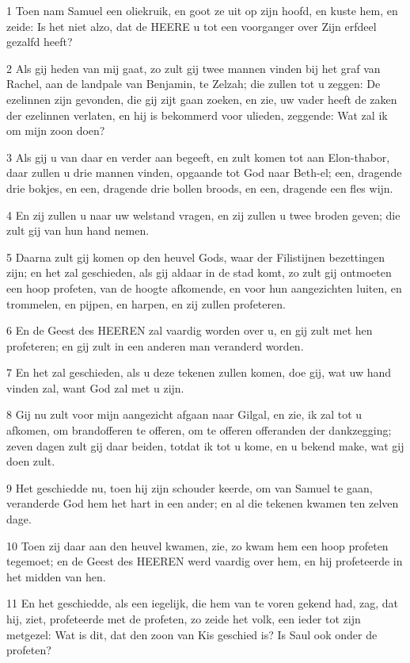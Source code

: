 \par 1 Toen nam Samuel een oliekruik, en goot ze uit op zijn hoofd, en kuste hem, en zeide: Is het niet alzo, dat de HEERE u tot een voorganger over Zijn erfdeel gezalfd heeft?
\par 2 Als gij heden van mij gaat, zo zult gij twee mannen vinden bij het graf van Rachel, aan de landpale van Benjamin, te Zelzah; die zullen tot u zeggen: De ezelinnen zijn gevonden, die gij zijt gaan zoeken, en zie, uw vader heeft de zaken der ezelinnen verlaten, en hij is bekommerd voor ulieden, zeggende: Wat zal ik om mijn zoon doen?
\par 3 Als gij u van daar en verder aan begeeft, en zult komen tot aan Elon-thabor, daar zullen u drie mannen vinden, opgaande tot God naar Beth-el; een, dragende drie bokjes, en een, dragende drie bollen broods, en een, dragende een fles wijn.
\par 4 En zij zullen u naar uw welstand vragen, en zij zullen u twee broden geven; die zult gij van hun hand nemen.
\par 5 Daarna zult gij komen op den heuvel Gods, waar der Filistijnen bezettingen zijn; en het zal geschieden, als gij aldaar in de stad komt, zo zult gij ontmoeten een hoop profeten, van de hoogte afkomende, en voor hun aangezichten luiten, en trommelen, en pijpen, en harpen, en zij zullen profeteren.
\par 6 En de Geest des HEEREN zal vaardig worden over u, en gij zult met hen profeteren; en gij zult in een anderen man veranderd worden.
\par 7 En het zal geschieden, als u deze tekenen zullen komen, doe gij, wat uw hand vinden zal, want God zal met u zijn.
\par 8 Gij nu zult voor mijn aangezicht afgaan naar Gilgal, en zie, ik zal tot u afkomen, om brandofferen te offeren, om te offeren offeranden der dankzegging; zeven dagen zult gij daar beiden, totdat ik tot u kome, en u bekend make, wat gij doen zult.
\par 9 Het geschiedde nu, toen hij zijn schouder keerde, om van Samuel te gaan, veranderde God hem het hart in een ander; en al die tekenen kwamen ten zelven dage.
\par 10 Toen zij daar aan den heuvel kwamen, zie, zo kwam hem een hoop profeten tegemoet; en de Geest des HEEREN werd vaardig over hem, en hij profeteerde in het midden van hen.
\par 11 En het geschiedde, als een iegelijk, die hem van te voren gekend had, zag, dat hij, ziet, profeteerde met de profeten, zo zeide het volk, een ieder tot zijn metgezel: Wat is dit, dat den zoon van Kis geschied is? Is Saul ook onder de profeten?
